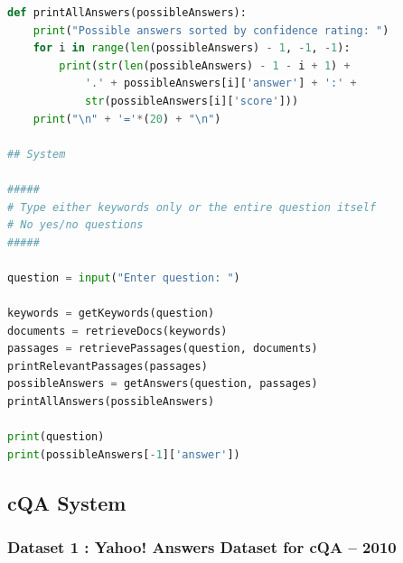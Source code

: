 \documentclass[12pt, a4paper]{article}
\begin{document}
\begin{lstlisting}[language = Python]
def printAllAnswers(possibleAnswers): 
    print("Possible answers sorted by confidence rating: ")
    for i in range(len(possibleAnswers) - 1, -1, -1): 
        print(str(len(possibleAnswers) - 1 - i + 1) + 
            '.' + possibleAnswers[i]['answer'] + ':' + 
            str(possibleAnswers[i]['score'])) 
    print("\n" + '='*(20) + "\n")

## System

##### 
# Type either keywords only or the entire question itself 
# No yes/no questions 
#####

question = input("Enter question: ")

keywords = getKeywords(question) 
documents = retrieveDocs(keywords) 
passages = retrievePassages(question, documents) 
printRelevantPassages(passages) 
possibleAnswers = getAnswers(question, passages) 
printAllAnswers(possibleAnswers)

print(question) 
print(possibleAnswers[-1]['answer']) 
\end{lstlisting}

\subsection{cQA System} 
\subsubsection{Dataset 1 : Yahoo! Answers Dataset for cQA – 2010} 
\end{document}
